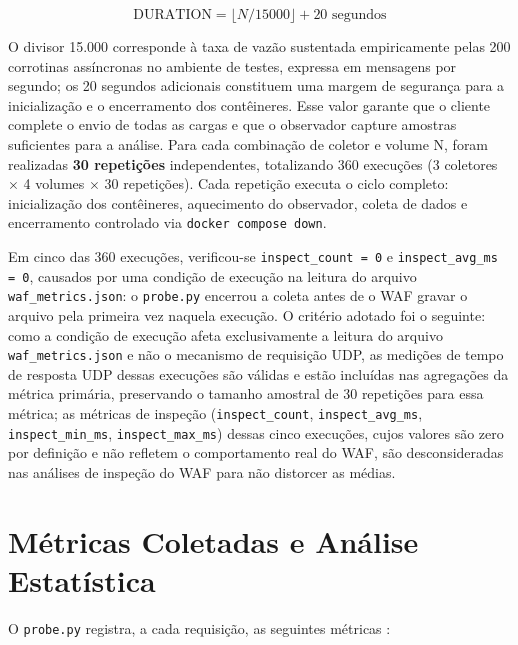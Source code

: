 \begin{equation}
\text{DURATION} = \lfloor N / 15000 \rfloor + 20 \text{ segundos}
\label{eq:duration}
\end{equation}

O divisor 15.000 corresponde à taxa de vazão sustentada empiricamente pelas 200 corrotinas assíncronas no ambiente de testes, expressa em mensagens por segundo; os 20 segundos adicionais constituem uma margem de segurança para a inicialização e o encerramento dos contêineres. Esse valor garante que o cliente complete o envio de todas as cargas e que o observador capture amostras suficientes para a análise. Para cada combinação de coletor e volume N, foram realizadas \textbf{30 repetições} independentes, totalizando 360 execuções (3 coletores $\times$ 4 volumes $\times$ 30 repetições). Cada repetição executa o ciclo completo: inicialização dos contêineres, aquecimento do observador, coleta de dados e encerramento controlado via \texttt{docker compose down}.

Em cinco das 360 execuções, verificou-se \texttt{inspect\_count = 0} e \texttt{inspect\_avg\_ms = 0}, causados por uma condição de execução na leitura do arquivo \texttt{waf\_metrics.json}: o \texttt{probe.py} encerrou a coleta antes de o WAF gravar o arquivo pela primeira vez naquela execução. O critério adotado foi o seguinte: como a condição de execução afeta exclusivamente a leitura do arquivo \texttt{waf\_metrics.json} e não o mecanismo de requisição UDP, as medições de tempo de resposta UDP dessas execuções são válidas e estão incluídas nas agregações da métrica primária, preservando o tamanho amostral de 30 repetições para essa métrica; as métricas de inspeção (\texttt{inspect\_count}, \texttt{inspect\_avg\_ms}, \texttt{inspect\_min\_ms}, \texttt{inspect\_max\_ms}) dessas cinco execuções, cujos valores são zero por definição e não refletem o comportamento real do WAF, são desconsideradas nas análises de inspeção do WAF para não distorcer as médias.

\section{Métricas Coletadas e Análise Estatística}

O \texttt{probe.py} registra, a cada requisição, as seguintes métricas \cite{rfc8172}:

